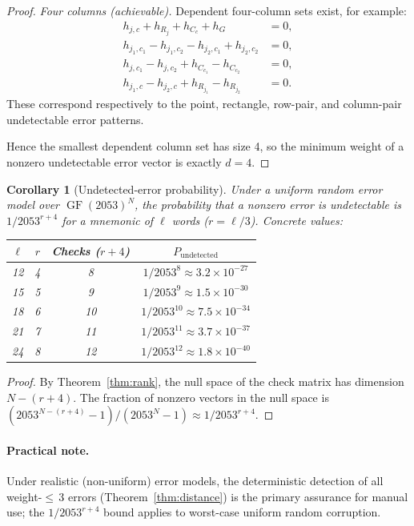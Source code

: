 \documentclass[11pt]{article}
\newcommand{\GF}{\operatorname{GF}}
\newtheorem{corollary}[theorem]{Corollary}
\begin{document}
\begin{proof}
\textit{Four columns (achievable).} Dependent four-column sets exist, for example:
\begin{align*}
    h_{j,c} + h_{R_j} + h_{C_c} + h_G &= 0, \\
    h_{j_1,c_1} - h_{j_1,c_2} - h_{j_2,c_1} + h_{j_2,c_2} &= 0, \\
    h_{j,c_1} - h_{j,c_2} + h_{C_{c_1}} - h_{C_{c_2}} &= 0, \\
    h_{j_1,c} - h_{j_2,c} + h_{R_{j_1}} - h_{R_{j_2}} &= 0.
\end{align*}
These correspond respectively to the point, rectangle, row-pair, and column-pair undetectable error patterns.

Hence the smallest dependent column set has size 4, so the minimum weight of a nonzero undetectable error vector is exactly $d = 4$.
\end{proof}

\begin{corollary}[Undetected-error probability]
\label{cor:prob}
Under a uniform random error model over $\GF(2053)^N$, the probability that a nonzero error is undetectable is $1/2053^{r+4}$ for a mnemonic of $\ell$ words ($r = \ell/3$). Concrete values:

\begin{center}
\small
\begin{tabular}{@{}cccc@{}}
\toprule
$\ell$ & $r$ & Checks ($r{+}4$) & $P_{\text{undetected}}$ \\ \midrule
12 & 4 & 8 & $1/2053^{8} \approx 3.2 \times 10^{-27}$ \\
15 & 5 & 9 & $1/2053^{9} \approx 1.5 \times 10^{-30}$ \\
18 & 6 & 10 & $1/2053^{10} \approx 7.5 \times 10^{-34}$ \\
21 & 7 & 11 & $1/2053^{11} \approx 3.7 \times 10^{-37}$ \\
24 & 8 & 12 & $1/2053^{12} \approx 1.8 \times 10^{-40}$ \\
\bottomrule
\end{tabular}
\end{center}
\end{corollary}

\begin{proof}
By Theorem~\ref{thm:rank}, the null space of the check matrix has dimension $N - (r+4)$. The fraction of nonzero vectors in the null space is $(2053^{N-(r+4)} - 1) / (2053^N - 1) \approx 1/2053^{r+4}$.
\end{proof}

\paragraph{Practical note.} Under realistic (non-uniform) error models, the deterministic detection of all weight-${\leq}\,3$ errors (Theorem~\ref{thm:distance}) is the primary assurance for manual use; the $1/2053^{r+4}$ bound applies to worst-case uniform random corruption.
\end{document}
